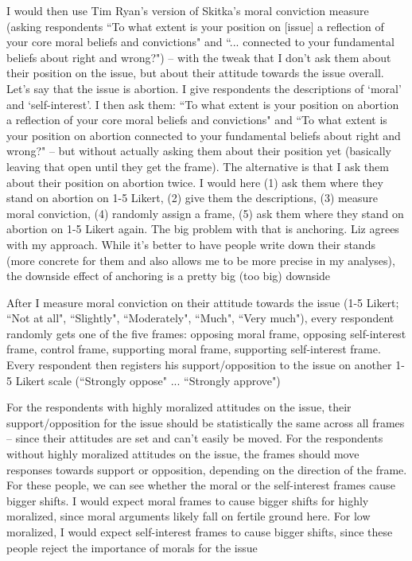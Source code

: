 \begin{coi}
\begin{coi}
				\item I would then use Tim Ryan's version of Skitka's moral conviction measure (asking respondents ``To what extent is your position on [issue] a reflection of your core moral beliefs and convictions" and ``... connected to your fundamental beliefs about right and wrong?") -- with the tweak that I don't ask them about their position on the issue, but about their attitude towards the issue overall. Let's say that the issue is abortion. I give respondents the descriptions of `moral' and `self-interest'. I then ask them: ``To what extent is your position on abortion a reflection of your core moral beliefs and convictions" and ``To what extent is your position on abortion connected to your fundamental beliefs about right and wrong?" -- but without actually asking them about their position yet (basically leaving that open until they get the frame). The alternative is that I ask them about their position on abortion twice. I would here (1) ask them where they stand on abortion on 1-5 Likert, (2) give them the descriptions, (3) measure moral conviction, (4) randomly assign a frame, (5) ask them where they stand on abortion on 1-5 Likert again. The big problem with that is anchoring. Liz agrees with my approach. While it's better to have people write down their stands (more concrete for them and also allows me to be more precise in my analyses), the downside effect of anchoring is a pretty big (too big) downside
				\item After I measure moral conviction on their attitude towards the issue (1-5 Likert; ``Not at all", ``Slightly", ``Moderately", ``Much", ``Very much"), every respondent randomly gets one of the five frames: opposing moral frame, opposing self-interest frame, control frame, supporting moral frame, supporting self-interest frame. Every respondent then registers his support/opposition to the issue on another 1-5 Likert scale (``Strongly oppose" ... ``Strongly approve")
				\item For the respondents with highly moralized attitudes on the issue, their support/opposition for the issue should be statistically the same across all frames -- since their attitudes are set and can't easily be moved. For the respondents without highly moralized attitudes on the issue, the frames should move responses towards support or opposition, depending on the direction of the frame. For these people, we can see whether the moral or the self-interest frames cause bigger shifts. I would expect moral frames to cause bigger shifts for highly moralized, since moral arguments likely fall on fertile ground here. For low moralized, I would expect self-interest frames to cause bigger shifts, since these people reject the importance of morals for the issue

\end{coi}
\end{coi}
